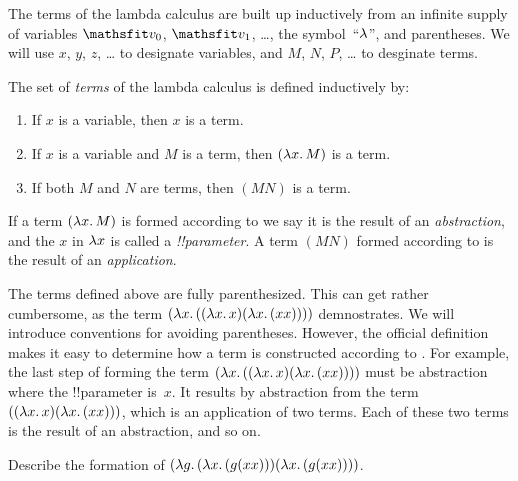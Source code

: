 \documentclass[../../../include/open-logic-section]{subfiles}
\begin{document}

The terms of the lambda calculus are built up inductively from an
infinite supply of variables $\Obj{v_0}$, $\Obj{v_1}$, \dots, the
symbol~``$\lambd$'', and parentheses. We will use $x$, $y$, $z$, \dots{}
to designate variables, and $M$, $N$, $P$, \dots{} to desginate terms.

\begin{defn}[Terms] 
The set of \emph{terms} of the lambda calculus is defined inductively by:
\begin{enumerate}
  \item {} If $x$ is a variable, then $x$ is a
    term.
  \item {} If $x$ is a variable and $M$ is a
    term, then $(\lambd[x][M])$ is a term.
  \item {} If both $M$ and $N$ are terms, then
    $(MN)$ is a term.
\end{enumerate}
\end{defn}

If a term $(\lambd[x][M])$ is formed according to
 we say it is the result of an
\emph{abstraction}, and the $x$ in $\lambd[x]$ is called a
\emph{!!{parameter}}.  A term $(MN)$ formed according to
 is the result of an \emph{application}.

The terms defined above are fully parenthesized. This can get rather
cumbersome, as the term
$(\lambd[x][((\lambd[x][x])(\lambd[x][(xx)]))])$ demnostrates. We will
introduce conventions for avoiding parentheses.  However, the official
definition makes it easy to determine how a term is constructed
according to . For example, the last step of forming
the term $(\lambd[x][((\lambd[x][x])(\lambd[x][(xx)]))])$ must be
abstraction where the !!{parameter} is~$x$. It results by abstraction
from the term $((\lambd[x][x])(\lambd[x][(xx)]))$, which is an
application of two terms. Each of these two terms is the result of an
abstraction, and so on.

\begin{prob}
Describe the formation of $(\lambd[g][(\lambd[x][(g (x x))])
  (\lambd[x][(g (x x))])])$.
\end{prob}
\end{document}
